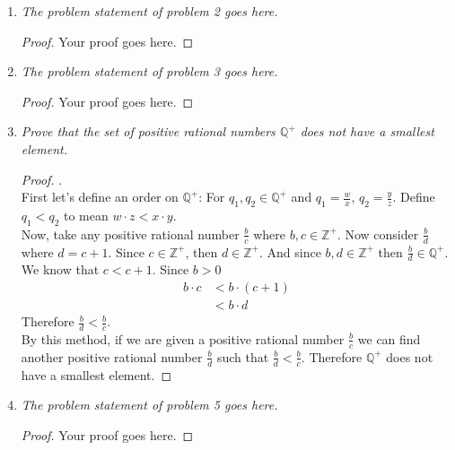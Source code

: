 \documentclass{amsart}
\begin{document}
\begin{enumerate}[1.]
\item \emph{The problem statement of problem 2 goes here.}
\begin{proof}
Your proof goes here.
\end{proof}


\newpage

\item \emph{The problem statement of problem 3 goes here.}
\begin{proof}
Your proof goes here.
\end{proof}


\newpage

\item \emph{Prove that the set of positive rational numbers $\mathbb{Q}^+$ does not have a smallest element.}
\begin{proof} .\\

First let's define an order on $\mathbb{Q}^+$:
For $q_1, q_2\in\mathbb{Q}^+$ and $q_1=\frac{w}{x}$, 
$q_2=\frac{y}{z}$. Define $q_1 < q_2$ to mean $w\cdot z < x\cdot y$. \\

Now, take any positive rational number $\frac{b}{c}$ 
where $b,c\in\mathbb{Z}^+$. Now consider $\frac{b}{d}$ where $d=c+1$. 
Since $c\in\mathbb{Z}^+$, then $d\in\mathbb{Z}^+$. And since 
$b,d\in\mathbb{Z}^+$ then $\frac{b}{d}\in\mathbb{Q}^+$. \\

We know that $c < c+1$. Since $b > 0$ 
\begin{align*}
    b\cdot c &< b\cdot(c+1) \\
    &< b\cdot d
\end{align*}
Therefore $\frac{b}{d}<\frac{b}{c}$. \\

By this method, if we are given
a positive rational number $\frac{b}{c}$ we can find another positive
rational number $\frac{b}{d}$ such that $\frac{b}{d}<\frac{b}{c}$.
Therefore $\mathbb{Q}^+$ does not have a smallest element.

\end{proof}

\newpage

\item \emph{The problem statement of problem 5 goes here.}
\begin{proof}
Your proof goes here.
\end{proof}

\newpage



\end{enumerate}
\end{document}
